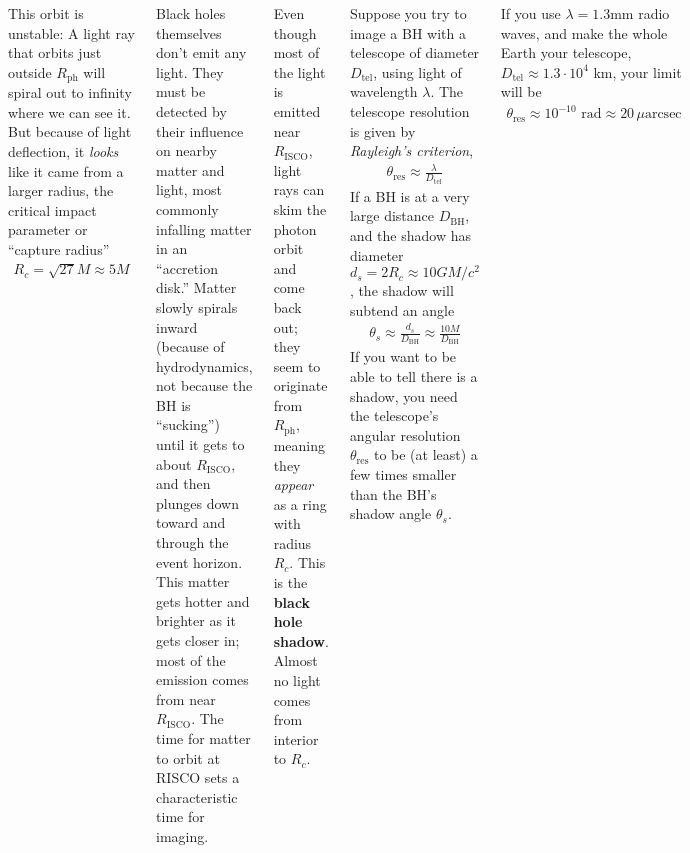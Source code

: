 \documentclass[25pt, a0paper, landscape]{tikzposter}
\begin{document}
\begin{columns}
{      This orbit is unstable: A light ray that orbits just outside
      $R_{\text{ph}}$ will spiral out to infinity where we can see it. But
      because of light deflection, it \emph{looks} like it came from a larger
      radius, the critical impact parameter or ``capture radius''
      \begin{align*}
        R_{c} =\sqrt{27}M \approx 5M
      \end{align*}

      Black holes themselves don’t emit any light. They must be
      detected by their influence on nearby matter and light, most
      commonly infalling matter in an ``accretion disk.'' Matter
      slowly spirals inward (because of hydrodynamics, not because the
      BH is ``sucking'') until it gets to about $R_{\text{ISCO}}$, and
      then plunges down toward and through the event horizon. This
      matter gets hotter and brighter as it gets closer in; most of
      the emission comes from near $R_{\text{ISCO}}$. The time for
      matter to orbit at RISCO sets a characteristic time for imaging.

      Even though most of the light is emitted near $R_{\text{ISCO}}$,
      light rays can skim the photon orbit and come back out; they
      seem to originate from $R_{\text{ph}}$, meaning they \emph{appear} as a
      ring with radius $R_{c}$. This is the \textbf{black hole
        shadow}. Almost no light comes from interior to $R_c$.
    }

    {
      Suppose you try to image a BH with a telescope of diameter
      $D_{\text{tel}}$, using light of wavelength $\lambda$. The
      telescope resolution is given by \emph{Rayleigh’s criterion},
      \begin{align*}
        \theta_{\text{res}} \approx \frac{\lambda}{D_{\text{tel}}}
      \end{align*}
      If a BH is at a very large distance $D_{\text{BH}}$, and the
      shadow has diameter $d_{s}=2R_{c}\approx 10GM/c^{2}$, the shadow
      will subtend an angle
      \begin{align*}
        \theta_{s} \approx \frac{d_{s}}{D_{\text{BH}}} \approx \frac{10 M}{D_{\text{BH}}}
      \end{align*}
      If you want to be able to tell there is a shadow, you need the
      telescope’s angular resolution $\theta_{\text{res}}$ to be (at
      least) a few times smaller than the BH’s shadow angle
      $\theta_{s}$.

      If you use $\lambda=1.3$mm radio waves, and make the whole Earth
      your telescope, $D_{\text{tel}} \approx 1.3\cdot 10^{4}$ km,
      your limit will be
      \begin{align*}
        \theta_{\text{res}} \approx 10^{-10} \text{ rad} \approx 20 \,\mu\text{arcsec}
      \end{align*}

}
\end{columns}
\end{document}
